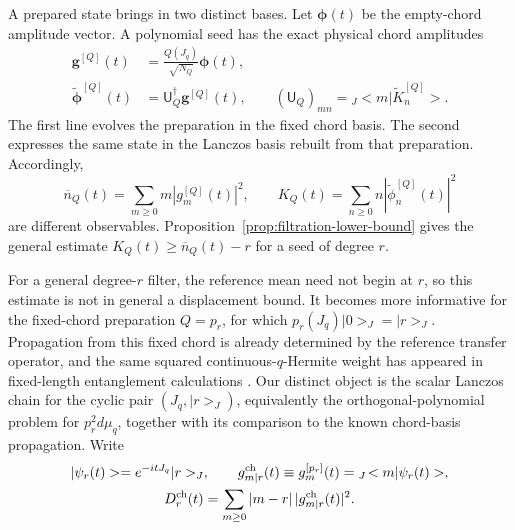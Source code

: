\documentclass[a4paper,11pt]{article}
\def\ket#1{|#1>}%
\def\braket#1#2{<#1|#2>}%
\def\dd{d}%
\def\ii{i}%
\def\ee{e}%
\def\Jac{J}%
\theoremstyle{definition}
\theoremstyle{remark}
\newcommand{\ket}[1]{|#1\rangle}
\newcommand{\braket}[2]{\langle #1\mid #2\rangle}
\newcommand{\dd}{\mathrm d}
\newcommand{\ii}{\mathrm i}
\newcommand{\ee}{\mathrm e}
\newcommand{\Jac}{\mathsf J}
\begin{document}
A prepared state brings in two distinct bases.  Let $\boldsymbol\phi(t)$ be the empty-chord
amplitude vector.  A polynomial seed has the exact physical chord amplitudes
\begin{equation}
\begin{aligned}
   \boldsymbol g^{[Q]}(t)
   &=\frac{Q(\Jac_q)}{\sqrt{N_Q}}\boldsymbol\phi(t),\\
   \widetilde{\boldsymbol\phi}^{[Q]}(t)
   &=\mathsf U_Q^\dagger\boldsymbol g^{[Q]}(t),
   \qquad
   (\mathsf U_Q)_{mn}={}_{\Jac}\!\braket{m}{\widetilde K_n^{[Q]}}.
\end{aligned}
   \label{eq:chord-two-basis-map}
\end{equation}
The first line evolves the preparation in the fixed chord basis.  The second expresses the same
state in the Lanczos basis rebuilt from that preparation.  Accordingly,
\begin{equation}
   \overline n_Q(t)=\sum_{m\ge0}m|g_m^{[Q]}(t)|^2,
   \qquad
   K_Q(t)=\sum_{n\ge0}n|\widetilde\phi_n^{[Q]}(t)|^2
   \label{eq:prepared-chord-mean}
\end{equation}
are different observables.  Proposition~\ref{prop:filtration-lower-bound} gives
the general estimate
$K_Q(t)\ge\overline n_Q(t)-r$ for a seed of degree $r$.

For a general degree-$r$ filter, the reference mean need not begin at $r$, so this estimate is not
in general a displacement bound.  It becomes more informative for the fixed-chord preparation
$Q=p_r$, for which $p_r(\Jac_q)\ket0_{\Jac}=\ket r_{\Jac}$.
Propagation from this fixed chord is already determined by the reference transfer operator,
and the same squared continuous-$q$-Hermite weight has appeared in fixed-length entanglement
calculations \cite{Tang2024FixedChordEntropy}.  Our distinct object is the scalar Lanczos chain
for the cyclic pair $(\Jac_q,\ket r_{\Jac})$, equivalently the orthogonal-polynomial problem for
$p_r^2\dd\mu_q$, together with its comparison to the known chord-basis propagation.
Write 
\begin{equation}
\begin{gathered}
   \ket{\psi_r(t)}=\ee^{-\ii t\Jac_q}\ket r_{\Jac},
   \qquad
   g_{m|r}^{\rm ch}(t)\equiv g_m^{[p_r]}(t)
      ={}_{\Jac}\!\braket{m}{\psi_r(t)},\\
   D_r^{\rm ch}(t)=\sum_{m\ge0}|m-r|\,
      |g_{m|r}^{\rm ch}(t)|^2 .
\end{gathered}
   \label{eq:chord-radial-distance}
\end{equation}
\end{document}
